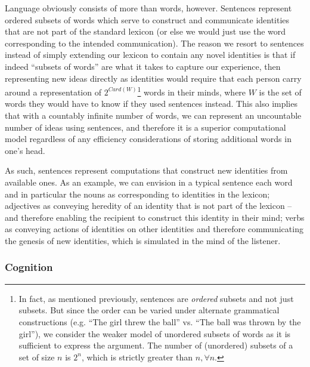 \documentclass[pra,twocolumn,groupedaddress,10pt]{revtex4}
\theoremstyle{definition}
\begin{document}
Language obviously consists of more than words, however. Sentences represent ordered subsets of words which serve to construct and communicate identities that are not part of the standard lexicon (or else we would just use the word corresponding to the intended communication). The reason we resort to sentences instead of simply extending our lexicon to contain any novel identities is that if indeed ``subsets of words'' are what it takes to capture our experience, then representing new ideas directly as identities would require that each person carry around a representation of $2^{Card(W)}$\footnote{In fact, as mentioned previously, sentences are \textit{ordered} subsets and not just subsets. But since the order can be varied under alternate grammatical constructions (e.g. ``The girl threw the ball'' vs. ``The ball was thrown by the girl''), we consider the weaker model of unordered subsets of words as it is sufficient to express the argument. The number of (unordered) subsets of a set of size $n$ is $2^{n}$, which is strictly greater than $n, \forall n$.} words in their minds, where $W$ is the set of words they would have to know if they used sentences instead. This also implies that with a countably infinite number of words, we can represent an uncountable number of ideas using sentences, and therefore it is a superior computational model regardless of any efficiency considerations of storing additional words in one's head.

As such, sentences represent computations that construct new identities from available ones. As an example, we can envision in a typical sentence each word and in particular the nouns as corresponding to identities in the lexicon; adjectives as conveying heredity of an identity that is not part of the lexicon -- and therefore enabling the recipient to construct this identity in their mind; verbs as conveying actions of identities on other identities and therefore communicating the genesis of new identities, which is simulated in the mind of the listener.

\subsubsection{Cognition} \label{sec:cognition}
\end{document}
